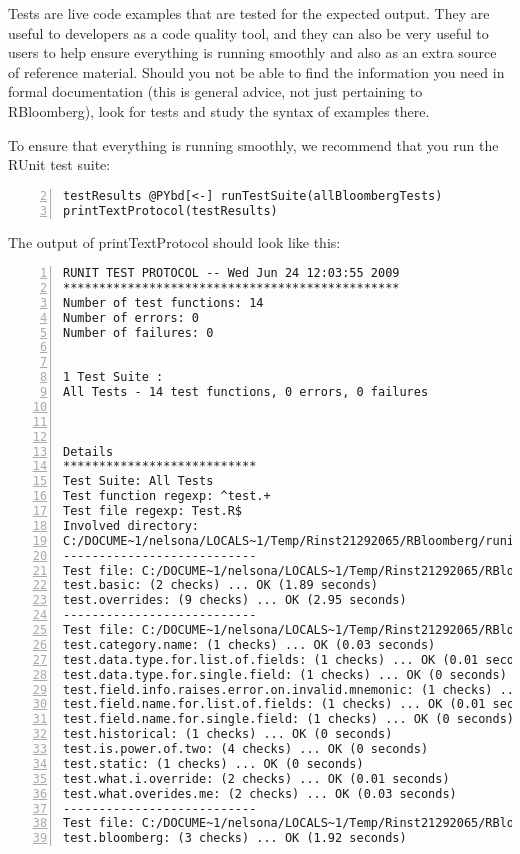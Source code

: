 \documentclass[a4paper]{article}
\begin{document}
Tests are live code examples that are tested for the expected output. They are useful to developers as a code quality tool, and they can also be very useful to users to help ensure everything is running smoothly and also as an extra source of reference material. Should you not be able to find the information you need in formal documentation (this is general advice, not just pertaining to RBloomberg), look for tests and study the syntax of examples there.

To ensure that everything is running smoothly, we recommend that you run the RUnit test suite:

\begin{Verbatim}[commandchars=@\[\],numbers=left,firstnumber=2,stepnumber=1]
testResults @PYbd[<-] runTestSuite(allBloombergTests)
printTextProtocol(testResults)
\end{Verbatim}

    

The output of printTextProtocol should look like this:

\begin{Verbatim}[commandchars=@\[\],numbers=left,firstnumber=1,stepnumber=1]
RUNIT TEST PROTOCOL -- Wed Jun 24 12:03:55 2009 
*********************************************** 
Number of test functions: 14 
Number of errors: 0 
Number of failures: 0 

 
1 Test Suite : 
All Tests - 14 test functions, 0 errors, 0 failures



Details 
*************************** 
Test Suite: All Tests 
Test function regexp: ^test.+ 
Test file regexp: Test.R$ 
Involved directory: 
C:/DOCUME~1/nelsona/LOCALS~1/Temp/Rinst21292065/RBloomberg/runit-tests 
--------------------------- 
Test file: C:/DOCUME~1/nelsona/LOCALS~1/Temp/Rinst21292065/RBloomberg/runit-tests/blpGetDataTest.R 
test.basic: (2 checks) ... OK (1.89 seconds)
test.overrides: (9 checks) ... OK (2.95 seconds)
--------------------------- 
Test file: C:/DOCUME~1/nelsona/LOCALS~1/Temp/Rinst21292065/RBloomberg/runit-tests/blpToolsTest.R 
test.category.name: (1 checks) ... OK (0.03 seconds)
test.data.type.for.list.of.fields: (1 checks) ... OK (0.01 seconds)
test.data.type.for.single.field: (1 checks) ... OK (0 seconds)
test.field.info.raises.error.on.invalid.mnemonic: (1 checks) ... OK (0 seconds)
test.field.name.for.list.of.fields: (1 checks) ... OK (0.01 seconds)
test.field.name.for.single.field: (1 checks) ... OK (0 seconds)
test.historical: (1 checks) ... OK (0 seconds)
test.is.power.of.two: (4 checks) ... OK (0 seconds)
test.static: (1 checks) ... OK (0 seconds)
test.what.i.override: (2 checks) ... OK (0.01 seconds)
test.what.overides.me: (2 checks) ... OK (0.03 seconds)
--------------------------- 
Test file: C:/DOCUME~1/nelsona/LOCALS~1/Temp/Rinst21292065/RBloomberg/runit-tests/rcomBloombergTest.R 
test.bloomberg: (3 checks) ... OK (1.92 seconds)
\end{Verbatim}
\end{document}
